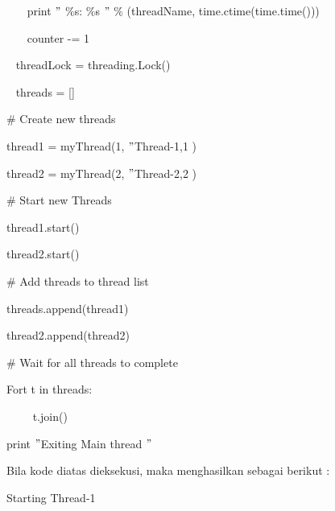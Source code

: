 \noindent 
{\fontsize{10pt}{10pt}\selectfont ~~~ print  $ " $ $  \%  $s:  $  \%  $s $ " $  $  \%  $ (threadName, time.ctime(time.time()))} \par
\noindent 
{\fontsize{10pt}{10pt}\selectfont ~~~ counter -= 1} \par
\noindent 
{\fontsize{10pt}{10pt}\selectfont ~ threadLock = threading.Lock()} \par
\noindent 
{\fontsize{10pt}{10pt}\selectfont ~ threads = []} \par
\vspace{10pt}
\noindent 
{\fontsize{10pt}{10pt}\selectfont  $  \#  $ Create new threads} \par
\noindent 
{\fontsize{10pt}{10pt}\selectfont thread1 = myThread(1,  $ " $Thread-1,1 )} \par
\noindent 
{\fontsize{10pt}{10pt}\selectfont thread2 = myThread(2,  $ " $Thread-2,2 )} \par
\vspace{10pt}
\noindent 
{\fontsize{10pt}{10pt}\selectfont  $  \#  $ Start new Threads} \par
\noindent 
{\fontsize{10pt}{10pt}\selectfont thread1.start()} \par
\noindent 
{\fontsize{10pt}{10pt}\selectfont thread2.start()} \par
\vspace{10pt}
\noindent 
{\fontsize{10pt}{10pt}\selectfont  $  \#  $ Add threads to thread list} \par
\noindent 
{\fontsize{10pt}{10pt}\selectfont threads.append(thread1)} \par
\noindent 
{\fontsize{10pt}{10pt}\selectfont thread2.append(thread2)} \par
\vspace{10pt}
\noindent 
{\fontsize{10pt}{10pt}\selectfont  $  \#  $ Wait for all threads to complete} \par
\noindent 
{\fontsize{10pt}{10pt}\selectfont Fort t in threads:} \par
\noindent 
{\fontsize{10pt}{10pt}\selectfont ~~~~ t.join()} \par
\noindent 
{\fontsize{10pt}{10pt}\selectfont print  $ " $Exiting Main thread $ " $} \par
\vspace{10pt}
\noindent 
Bila kode diatas dieksekusi, maka menghasilkan sebagai berikut : \par
\vspace{10pt}
\noindent 
{\fontsize{10pt}{10pt}\selectfont Starting Thread-1} \par
